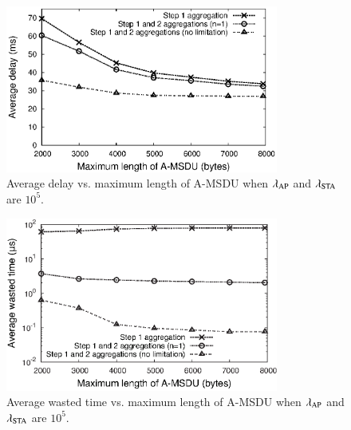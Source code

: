 \documentclass[master]{kuisthesis}		%
\begin{document}
			\begin{figure}[t]
				\begin{center}
					\includegraphics[width=0.8\textwidth]{graph/dly_max.eps}
					\caption{Average delay vs. maximum length of A-MSDU when $\lambda_{\rm AP}$ and $\lambda_{\rm STA}$ are $10^{5}$.}
					\label{fig:dly_max}
				\end{center}
			\end{figure}
			\begin{figure}[t]
				\begin{center}
					\includegraphics[width=0.8\textwidth]{graph/wst_max.eps}
					\caption{Average wasted time vs. maximum length of A-MSDU when $\lambda_{\rm AP}$ and $\lambda_{\rm STA}$ are $10^{5}$.}
					\label{fig:wst_max}
				\end{center}
			\end{figure}
\end{document}
